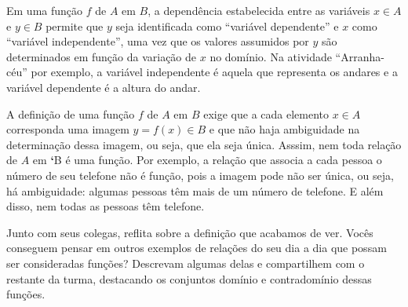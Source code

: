Em uma função \(f\) de \(A\) em \(B\), a dependência estabelecida entre as variáveis \(x \in A\) e \(y \in B\) permite que \(y\) seja identificada como “variável dependente” e \(x\) como  “variável independente”, uma vez que os valores assumidos por \(y\) são determinados em função da variação de \(x\) no domínio. Na atividade “Arranha-céu” por exemplo, a variável independente é aquela que representa os andares e a variável dependente é a altura do andar.

\begin{observation}{}

A definição de uma função \(f\) de \(A\) em \(B\) exige que a cada elemento \(x\in A\) corresponda uma imagem \(y=f(x)\in B\) e que não haja ambiguidade na determinação dessa imagem, ou seja, que ela seja única. Asssim, nem toda relação de \(A\) em {\color{red}\bfseries{}{}`}B é uma função. Por exemplo, a relação que associa a cada pessoa o número de seu telefone não é função, pois a imagem pode não ser única, ou seja, há ambiguidade: algumas pessoas têm mais de um número de telefone. E além disso, nem todas as pessoas têm telefone.
\end{observation}

\begin{reflection}
Junto com seus colegas, reflita sobre a definição que acabamos de ver. Vocês conseguem pensar em outros exemplos de relações do seu dia a dia que possam ser consideradas funções? Descrevam algumas delas e compartilhem com o restante da turma, destacando os conjuntos domínio e contradomínio dessas funções.
\end{reflection}
\newpage

